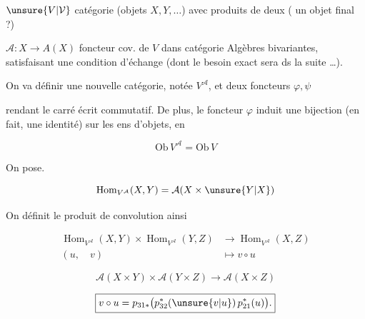 $\unsure{V|\mathcal V}$ catégorie (objets $X,Y,\ldots$) avec produits de deux  ( un objet final ?)

$\mathcal A\colon X\to A(X)$ foncteur cov. de $V$ dans  catégorie   Algèbres  bivariantes, satisfaisant une condition d'échange    (dont le besoin exact sera  ds la suite \ldots).

On va définir une nouvelle catégorie, notée $V^{\mathcal A}$, et deux foncteurs $\varphi,\psi$


rendant le carré écrit commutatif. De plus, le foncteur $\varphi$ induit une bijection (en fait, une identité) sur les ens d'objets, en  

\[
\mathrm{Ob}\,V^{\mathcal A}=\mathrm{Ob}\,V
\]

On pose.

\[
\operatorname{Hom}_{V^{\mathcal A}}(X,Y)=\mathcal A(X\times \unsure{Y|X})
\]

On définit le produit de convolution ainsi

\[
\begin{aligned}
\operatorname{Hom}_{V^{\mathcal A}}(X,Y)\times\operatorname{Hom}_{V^{\mathcal A}}(Y,Z)&\longrightarrow\operatorname{Hom}_{V^{\mathcal A}}(X,Z)\\
(u,\quad v)&\longmapsto v\circ u
\end{aligned}
\]

\[
\mathcal A(X\times Y)\times\mathcal A(Y\times Z)\longrightarrow\mathcal A(X\times Z)
\]


\[
\boxed{v\circ u=p_{31*}\bigl(p_{32}^{*}(\unsure{v|u})\,p_{21}^{*}(u)\bigr).}
\]

